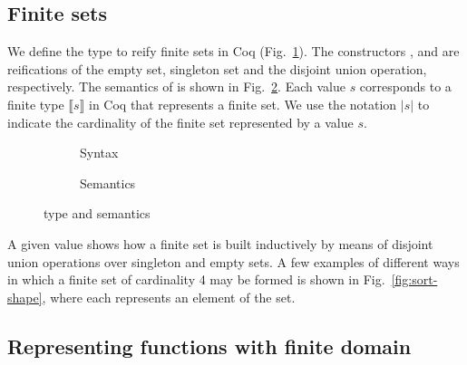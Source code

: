 \subsection{Finite sets}
We define the type  to reify finite sets in Coq
(Fig.~\ref{code:coq-sort-type}).
The constructors ,  and  are
reifications of the empty set, singleton set and the disjoint union
operation, respectively.
The semantics of  is shown in
Fig.~\ref{code:coq-sort-sem}.
Each  value $s$ corresponds to a finite type $⟦s⟧$ in Coq
that represents a finite set.
We use the notation $|s|$ to indicate the cardinality of the finite
set represented by a  value $s$.

\begin{figure}
\begin{subfigure}{0.5\textwidth}
  
  \caption{Syntax}
  \label{code:coq-sort-type}
\end{subfigure}
\begin{subfigure}{0.5\textwidth}
  
  \caption{Semantics}
  \label{code:coq-sort-sem}
\end{subfigure}
\caption{ type and semantics}
\label{code:coq-sort-types}
\end{figure}

%
A given  value  shows how a finite set is built
inductively by means of disjoint union operations over singleton and
empty sets.
%
A few examples of different ways in which a finite set of cardinality
4 may be formed is shown in Fig.~\ref{fig:sort-shape}, where each
\blackcircle{} represents an element of the set.

\subsection{Representing functions with finite domain}

